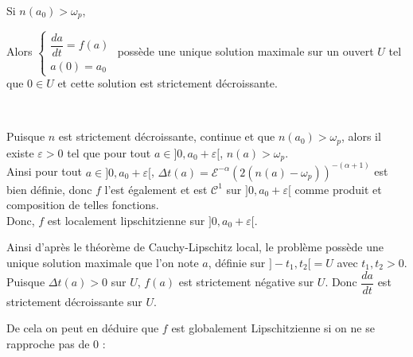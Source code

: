 \documentclass[12pt,a4paper]{article}
\begin{document}
	\begin{prop}[décroissance]
		Si $n(a_0) > \omega_p$,\\
		\begin{minipage}{18.5cm}
			Alors $\begin{cases}
				\dfrac{da}{dt} = f(a) \\
				a(0) = a_0
			\end{cases}$ possède une unique solution maximale sur un ouvert $U$ tel que $0\in U$ et cette solution est strictement décroissante.
		\end{minipage}
	\end{prop}
	\begin{dem}$ $
		
		\vspace{.2cm}
		
		\begin{minipage}{17.5cm}
			Puisque $n$ est strictement décroissante, continue et que $n(a_0) > \omega_p$, alors il existe $\varepsilon > 0$ tel que pour tout $a \in ]0,a_0+\varepsilon[$, $n(a) > \omega_p$.\\ 
			Ainsi pour tout $a \in ]0,a_0+\varepsilon[$, $\Delta t(a) = \mathcal{E}^{-\alpha}\left(2(n(a)-\omega_p)\right)^{-(\alpha+1)}$ est bien définie, donc $f$ l'est également et est $\mathcal{C}^1$ sur $]0,a_0+\varepsilon[$ comme produit et composition de telles fonctions.\\
			Donc, $f$ est localement lipschitzienne sur $]0,a_0+\varepsilon[$.
		\end{minipage}
		\begin{minipage}{17.5cm}
			Ainsi d'après le théorème de Cauchy-Lipschitz local, le problème possède une unique solution maximale que l'on note $a$, définie sur $]-t_1,t_2[= U$ avec $t_1,t_2 >0$. 
			Puisque $\Delta t(a) > 0$ sur $U$, $f(a)$ est strictement négative sur $U$. Donc $\dfrac{da}{dt}$ est strictement décroissante sur $U$.
			
		\end{minipage}
	\end{dem}
	
	De cela on peut en déduire que $f$ est globalement Lipschitzienne si on ne se rapproche pas de 0 : 
	
\end{document}
